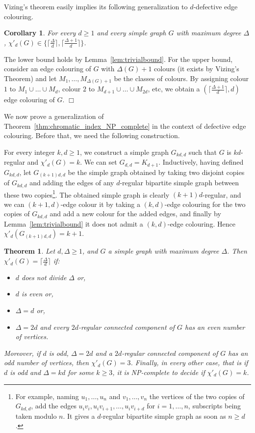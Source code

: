 \documentclass[11pt]{article}
\newtheorem{theorem}[lemma]{Theorem}
\newtheorem{corollary}[lemma]{Corollary}
\newcounter{claim}
\newenvironment{proof}[1][]%
 {\noindent {\setcounter{claim}{0}\sc proof ---
   }{#1}{}}{\hfill$\Box$\vspace{2ex}}
\begin{document}
Vizing's theorem easily implies its following generalization to $d$-defective edge colouring. 
\begin{corollary}\label{coro:vizing}
For every $d \geq 1$ and every simple graph $G$ with maximum degree $\Delta$, $\chi'_{d}(G) \in \{ \lceil \frac{\Delta}{d} \rceil, \lceil \frac{\Delta+1}{d} \rceil \}$.
\end{corollary}


\begin{proof}
The lower bound holds by Lemma~\ref{lem:trivialbound}. For the upper bound,  consider an edge colouring of $G$ with $\Delta(G) + 1$ colours (it exists by Vizing's Theorem) and let $M_1 , \dots , M_{\Delta(G) + 1}$ be the classes of colours. By assigning colour $1$ to $M_1 \cup \dots \cup M_{d}$, colour $2$ to $M_{d + 1} \cup \dots \cup M_{2d}$,  etc,  we obtain a $(\lceil \frac{\Delta+1}{d} \rceil,d)$ edge colouring of $G$.
\end{proof}

We now prove a generalization of Theorem~\ref{thm:chromatic_index_NP_complete} in the context of defective edge colouring. Before that, we need the following construction.  

For every integer $k,d \geq 1$, we construct a simple graph $G_{kd, d}$ such that $G$ is $kd$-regular and $\chi'_{d}(G) = k$. 
We can set $G_{d,d} = K_{d+1}$. Inductively, having defined $G_{kd,d}$, let $G_{(k+1)d,d}$ be the simple graph obtained by taking two disjoint copies of $G_{kd,d}$  and adding the edges of any $d$-regular bipartite simple graph between these two copies\footnote{For example, naming $u_1, \dots, u_n$ and $v_1, \dots, v_n$ the vertices of the two copies of $G_{kd,d}$, add the edges $u_iv_i, u_iv_{i+1}, \dots, u_iv_{i+d}$ for $i=1, \dots, n$, subscripts being taken modulo $n$. It gives a $d$-regular bipartite simple graph as soon as $n \geq d$.}. 
The obtained simple graph is clearly $(k+1)d$-regular, and we can $(k+1, d)$-edge colour it by taking a $(k,d)$-edge colouring for the two copies of $G_{kd,d}$ and add a new colour for the added edges, and finally  by Lemma~\ref{lem:trivialbound} it does not admit a $(k,d)$-edge colouring. Hence  $\chi'_d(G_{(k+1)d,d}) = k+1$.

\begin{theorem}\label{thm:NP}
Let $d, \Delta \geq 1$, and $G$ a simple graph with maximum degree $\Delta$.  
Then $\chi'_d(G) = \lceil \frac{\Delta}{d} \rceil$ if:
\begin{itemize}
    \item $d$ does not divide $\Delta$ or, 
    \item $d$ is even or, 
    \item $\Delta = d$ or,
    \item $\Delta = 2d$ and every $2d$-regular connected component of $G$ has an even number of vertices. 
\end{itemize}
Moreover, if $d$ is odd, $\Delta = 2d$ and a $2d$-regular connected component of $G$ has an odd number of vertices, then $\chi'_{d}(G) = 3$. 
Finally, in every other case, that is if $d$ is odd and $\Delta = kd$ for some $k \geq 3$, it is NP-complete to decide if $\chi'_d(G) = k $. 
\end{theorem}
\end{document}
